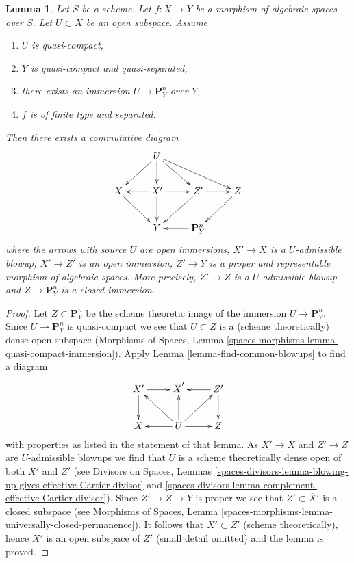 \documentclass[10pt,a4paper]{amsart}
\theoremstyle{plain}
\newtheorem{lemma}[subsection]{Lemma}
\theoremstyle{definition}
\theoremstyle{remark}
\numberwithin{equation}{subsection}
\begin{document}
\begin{lemma}
\label{lemma-blowup-to-find-embedding}
Let $S$ be a scheme. Let $f : X \to Y$ be a morphism of algebraic spaces
over $S$. Let $U \subset X$ be an open subspace. Assume
\begin{enumerate}
\item $U$ is quasi-compact,
\item $Y$ is quasi-compact and quasi-separated,
\item there exists an immersion $U \to \mathbf{P}^n_Y$ over $Y$,
\item $f$ is of finite type and separated.
\end{enumerate}
Then there exists a commutative diagram
$$
\xymatrix{
& U \ar[ld] \ar[d] \ar[rd] \ar[rrd] \\
X \ar[rd] & X' \ar[l] \ar[d] \ar[r] & Z' \ar[ld] \ar[r] & Z \ar[ld] \\
& Y & \mathbf{P}^n_Y \ar[l]
}
$$
where
the arrows with source $U$ are open immersions,
$X' \to X$ is a $U$-admissible blowup,
$X' \to Z'$ is an open immersion,
$Z' \to Y$ is a proper and representable morphism of algebraic spaces.
More precisely, $Z' \to Z$ is a $U$-admissible blowup
and $Z \to \mathbf{P}^n_Y$ is a closed immersion.
\end{lemma}

\begin{proof}
Let $Z \subset \mathbf{P}^n_Y$ be the scheme theoretic image of
the immersion $U \to \mathbf{P}^n_Y$. Since $U \to \mathbf{P}^n_Y$
is quasi-compact we see that $U \subset Z$ is a
(scheme theoretically) dense open subspace
(Morphisms of Spaces, Lemma
\ref{spaces-morphisms-lemma-quasi-compact-immersion}).
Apply Lemma \ref{lemma-find-common-blowups} to find a diagram
$$
\xymatrix{
X' \ar[d] \ar[r] & \overline{X}' & Z' \ar[l] \ar[d] \\
X & U \ar[l] \ar[lu] \ar[u] \ar[ru] \ar[r] & Z
}
$$
with properties as listed in the statement of that lemma.
As $X' \to X$ and $Z' \to Z$ are $U$-admissible blowups
we find that $U$ is a scheme theoretically dense open of
both $X'$ and $Z'$ (see Divisors on Spaces, Lemmas
\ref{spaces-divisors-lemma-blowing-up-gives-effective-Cartier-divisor} and
\ref{spaces-divisors-lemma-complement-effective-Cartier-divisor}).
Since $Z' \to Z \to Y$ is proper we see that $Z' \subset \overline{X}'$
is a closed subspace (see Morphisms of Spaces, Lemma
\ref{spaces-morphisms-lemma-universally-closed-permanence}).
It follows that $X' \subset Z'$ (scheme theoretically), hence $X'$
is an open subspace of $Z'$ (small detail omitted) and the lemma is proved.
\end{proof}
\end{document}
